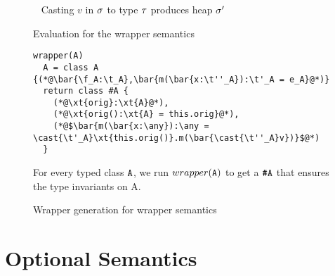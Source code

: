 \documentclass{sigplanconf}
\newcommand{\opdef}[2]{\framebox[1.1\width]{#1} ~ #2\\}
\begin{document}
\begin{figure}
\opdef{$\sigma' = \text{cast}(\s, v, \t)$}{Casting $v$ in $\s$ to type $\t$ produces heap $\s'$}
\begin{mathpar}
\end{mathpar}
\caption{Evaluation for the wrapper semantics}
\end{figure}

\begin{figure}

\begin{lstlisting}
wrapper(A)
  A = class A {(*@\bar{\f_A:\t_A},\bar{m(\bar{x:\t''_A}):\t'_A = e_A}@*)}
  return class #A {
    (*@\xt{orig}:\xt{A}@*),
    (*@\xt{orig():\xt{A} = this.orig}@*),
    (*@$\bar{m(\bar{x:\any}):\any = \cast{\t'_A}\xt{this.orig()}.m(\bar{\cast{\t''_A}v})}$@*)
  }
\end{lstlisting}

For every typed class $\xt{A}$, we run $wrapper(\xt{A})$ to get a $\xt{\#A}$ that ensures the type invariants on A.
\caption{Wrapper generation for wrapper semantics}
\end{figure}

\section{Optional Semantics}
\end{document}
